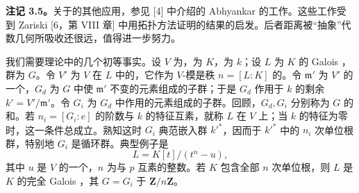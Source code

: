 \textbf{注记 3.5。}关于的其他应用，参见 [4] 中介绍的 Abhyankar 的工作。这些工作受到 Zariski [6，第 VIII 章] 中用拓扑方法证明的结果的启发。后者距离被“抽象”代数几何所吸收还很远，值得进一步努力。

我们需要理论中的几个初等事实。设 $V$ 为，为 $K$，为 $k$；设 $L$ 为 $K$ 的 Galois ，群为 $G$。令 $V'$ 为 $V$ 在 $L$ 中的，它作为 $V$-模是秩 $n=[L:K]$ 的。令 $\mathfrak m'$ 为 $V'$ 的一个，$G_d$ 为 $G$ 中使 $\mathfrak m'$ 不变的元素组成的子群；于是 $G_d$ 作用于 $k$ 的剩余 $k'=V'/\mathfrak m'$。令 $G_i$ 为 $G_d$ 中作用的元素组成的子群。回顾，$G_d,G_i$ 分别称为 $G$ 的和。若 $n_i=[G_i:e]$ 的阶数与 $k$ 的特征互素，就称 $L$ 在 $V$ 上；当 $k$ 的特征为零时，这一条件总成立。熟知这时 $G_i$ 典范嵌入群 $k'^*$，因而于 $k'^*$ 中的 $n_i$ 次单位根群，特别地 $G_i$ 是循环群。典型例子是
\[
L=K[t]/(t^n-u),
\]
其中 $u$ 是 $V$ 的一个，$n$ 为与 $p$ 互素的整数。若 $K$ 包含全部 $n$ 次单位根，则 $L$ 是 $K$ 的完全 Galois ，其  $G=G_i$ 于 $\mathbf Z/n\mathbf Z$。

